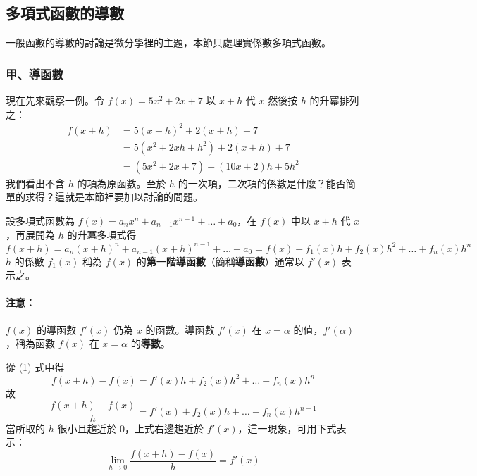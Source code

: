 \subsection{多項式函數的導數}\label{sec:b6-2-4}
\resetsectcounters

一般函數的導數的討論是微分學裡的主題，本節只處理實係數多項式函數。

\subsubsection*{甲、導函數}\label{subsec:b6-2-4-a}

現在先來觀察一例。令 $f(x)=5x^2+2x+7$ 以 $x+h$ 代 $x$ 然後按 $h$ 的升冪排列之：
\begin{align*}
f(x+h) &= 5(x+h)^2 + 2(x+h) + 7 \\
&= 5(x^2+2xh+h^2) + 2(x+h) + 7 \\
&= (5x^2+2x+7) + (10x+2)h + 5h^2
\end{align*}
我們看出不含 $h$ 的項為原函數。至於 $h$ 的一次項，二次項的係數是什麼？能否簡單的求得？這就是本節裡要加以討論的問題。

\begin{definition}\label{def:b6-2-derivative}
設多項式函數為 $f(x)=a_n x^n + a_{n-1} x^{n-1} + \dots + a_0$，在 $f(x)$ 中以 $x+h$ 代 $x$，再展開為 $h$ 的升冪多項式得
\begin{equation}
f(x+h) = a_n(x+h)^n + a_{n-1}(x+h)^{n-1} + \dots + a_0 = f(x) + f_1(x)h + f_2(x)h^2 + \dots + f_n(x)h^n \label{eq:b6-2-4-1}
\end{equation}
$h$ 的係數 $f_1(x)$ 稱為 $f(x)$ 的\textbf{第一階導函數}（簡稱\textbf{導函數}）通常以 $f'(x)$ 表示之。
\end{definition}

\paragraph{注意：}$f(x)$ 的導函數 $f'(x)$ 仍為 $x$ 的函數。導函數 $f'(x)$ 在 $x=\alpha$ 的值，$f'(\alpha)$，稱為函數 $f(x)$ 在 $x=\alpha$ 的\textbf{導數}。

\begin{discussion}\label{disc:b6-2-4}
從 (1) 式中得
\[ f(x+h) - f(x) = f'(x)h + f_2(x)h^2 + \dots + f_n(x)h^n \]
故
\[ \dfrac{f(x+h)-f(x)}{h} = f'(x) + f_2(x)h + \dots + f_n(x)h^{n-1} \]
當所取的 $h$ 很小且趨近於 0，上式右邊趨近於 $f'(x)$，這一現象，可用下式表示：
\[ \lim_{h \to 0} \dfrac{f(x+h)-f(x)}{h} = f'(x) \]
\end{discussion}

